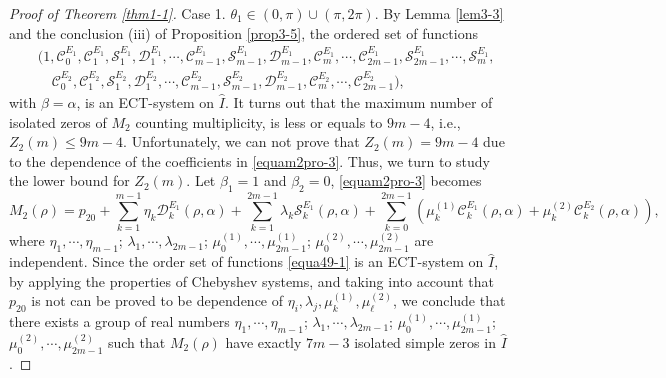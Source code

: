 \documentclass[11pt]{amsart}
\theoremstyle{remark}
\theoremstyle{definition}
\begin{document}
\begin{proof}[Proof of Theorem \ref{thm1-1}]
Case 1.    $\theta_1\in (0,\pi)\cup (\pi, 2\pi)$.   By  Lemma  \ref{lem3-3} and the conclusion (iii) of Proposition \ref{prop3-5},
the ordered set of functions
\begin{equation*}  \begin{split}&\bigg(1, \mathcal{C}_{0}^{E_1}, \mathcal{C}_{1}^{E_1}, \mathcal{S}_{1}^{E_1}, \mathcal{D}_{1}^{E_1},  \cdots, \mathcal{C}_{m-1}^{E_1}, \mathcal{S}_{m-1}^{E_1}, \mathcal{D}_{m-1}^{E_1}, \mathcal{C}_{m}^{E_1}, \cdots, \mathcal{C}_{2m-1}^{E_1}, \mathcal{S}_{2m-1}^{E_1}, \cdots, \mathcal{S}_{m}^{E_1},\\
&\quad \mathcal{C}_{0}^{E_2}, \mathcal{C}_{1}^{E_2}, \mathcal{S}_{1}^{E_2}, \mathcal{D}_{1}^{E_2},\cdots, \mathcal{C}_{m-1}^{E_2}, \mathcal{S}_{m-1}^{E_2}, \mathcal{D}_{m-1}^{E_2}, \mathcal{C}_{m}^{E_2}, \cdots, \mathcal{C}_{2m-1}^{E_2}\bigg),
 \end{split}  \end{equation*}
with $\beta=\alpha$, is an ECT-system on  $\hat{I}$. It turns out that
 the maximum number of isolated zeros  of  $M_2$ counting multiplicity, is less or equals to $9m-4$, i.e.,  $Z_2(m)\leq 9m-4$.
Unfortunately, we can not prove that $Z_2(m)=9m-4$ due to  the dependence of the coefficients in   \eqref{equam2pro-3}.  Thus, we   turn  to study the lower bound for  $Z_2(m)$. Let $\beta_1=1 $ and $\beta_2=0$,  \eqref{equam2pro-3} becomes
\begin{equation*} \label{60}
M_2(\rho)=p_{20}+\sum_{k=1}^{m-1}\eta_{k}\mathcal{D}_{k}^{E_1}(\rho,\alpha)
+\sum_{k=1}^{2m-1}\lambda_k\mathcal{S}_{k}^{E_1}(\rho,\alpha)
+\sum_{k=0}^{2m-1}\left(\mu_k^{(1)}\mathcal{C}_{k}^{E_1}(\rho,\alpha)+\mu_k^{(2)}\mathcal{C}_{k}^{E_2}(\rho,\alpha)\right),
\end{equation*}
where   ${\eta}_1,\cdots, {\eta}_{m-1}$;  ${\lambda}_1, \cdots, {\lambda}_{2m-1}$;  ${\mu}_0^{(1)}, \cdots, {\mu}_{2m-1}^{(1)}$; ${\mu}_0^{(2)}, \cdots, {\mu}_{2m-1}^{(2)}$ are independent.
Since  the order set of functions \eqref{equa49-1}
is an ECT-system on $\hat{I}$, by applying the properties of Chebyshev systems,   and taking into account that $p_{20}$ is not can be proved to be  dependence of  ${\eta}_i, {\lambda}_j,  {\mu}_k^{(1)},  {\mu}_{\ell}^{(2)}$,  we conclude that there exists   a group of real numbers  ${\eta}_1,\cdots, {\eta}_{m-1}$;  ${\lambda}_1, \cdots, {\lambda}_{2m-1}$;  ${\mu}_0^{(1)}, \cdots, {\mu}_{2m-1}^{(1)}$; ${\mu}_0^{(2)}, \cdots, {\mu}_{2m-1}^{(2)}$ such that
$ {M}_2(\rho)$
 have exactly   $7m-3$  isolated   simple  zeros  in $ \hat{I}$.


\end{proof}
\end{document}
